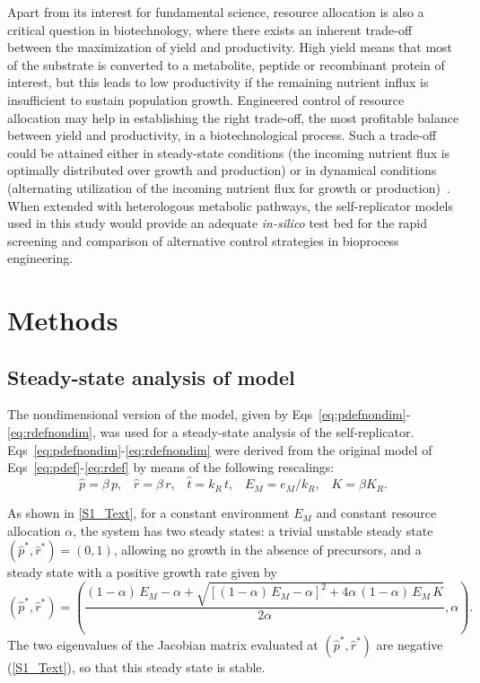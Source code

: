 Apart from its interest for fundamental science, resource allocation is also a critical question in biotechnology, where there exists an inherent trade-off between the maximization of yield and productivity\cite{venayak_engineering_2015}.
High yield means that most of the substrate is converted to a metabolite, peptide or recombinant protein of interest, but this leads to low productivity if the remaining nutrient influx is insufficient to sustain population growth.
Engineered control of resource allocation may help in establishing the right trade-off, the most profitable balance between yield and productivity, in a biotechnological process.
Such a trade-off could be attained either in steady-state conditions (the incoming nutrient flux is optimally distributed over growth and production) or in dynamical conditions (alternating utilization of the incoming nutrient flux for growth or production)~\cite{dahl_engineering_2013,xu_improving_2014,izard_synthetic_2015}.
When extended with heterologous metabolic pathways, the self-replicator models used in this study would provide an adequate \textit{in-silico} test bed for the rapid screening and comparison of alternative control strategies in bioprocess engineering.
 

\section{Methods}

\subsection{Steady-state analysis of model}
\label{sec:methods_model_analysis}

The nondimensional version of the model, given by Eqs~\ref{eq:pdefnondim}-\ref{eq:rdefnondim}, was used for a steady-state analysis of the self-replicator.
Eqs~\ref{eq:pdefnondim}-\ref{eq:rdefnondim} were derived from the original model of Eqs~\ref{eq:pdef}-\ref{eq:rdef} by means of the following rescalings:
\begin{equation*}
\hat{p}  = \beta \, p,\;\;\;
\hat{r}  = \beta \, r,\;\;\;
\hat{t}  = k_R \, t,\;\;\;
E_M = e_M/k_R,\;\;\;
K = \beta K_R.
\end{equation*}

As shown in \ref{S1_Text}, for a constant environment $E_M$ and constant resource allocation $\alpha$, the system has two steady states: a trivial unstable steady state $(\hat{p}^*, \hat{r}^*) = (0,1)$, allowing no growth in the absence of precursors, and a steady state with a positive growth rate given by
\begin{equation}
\label{eq:meth_steadystate}
(\hat{p}^*, \hat{r}^*) = \left( \frac{(1-\alpha)\, E_M - \alpha + \sqrt{[(1-\alpha)\, E_M - \alpha]^2 + 4\alpha\, (1-\alpha)\, E_M\, K}}{2\alpha}, \alpha \right).
\end{equation}
The two eigenvalues of the Jacobian matrix evaluated at $(\hat{p}^*, \hat{r}^*)$ are negative (\ref{S1_Text}), so that this steady state is stable.

